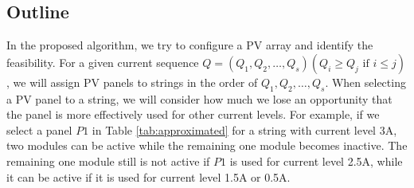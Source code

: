 \documentclass[conference]{IEEEtran}
\begin{document}

\subsection{Outline}

In the proposed algorithm, we try to configure a PV array and identify the feasibility. For a given current sequence $Q = (Q_{1},Q_{2},\ldots ,Q_{s}) (Q_{i} \geq Q_{j} \mbox{\ if\ } i \leq j)$, we will assign PV panels to strings in the order of $Q_{1},Q_{2},\ldots ,Q_{s}$. When selecting a PV panel to a string, we will consider how much we lose an opportunity that the panel is more effectively used for other current levels. For example, if we select a panel $P1$ in Table \ref{tab:approximated} for a string with current level 3A, two modules can be active while the remaining one module becomes inactive. 
The remaining one module still is not active if $P1$ is used for current level 2.5A, while it can be active if it is used for current level 1.5A or 0.5A. 
\end{document}
